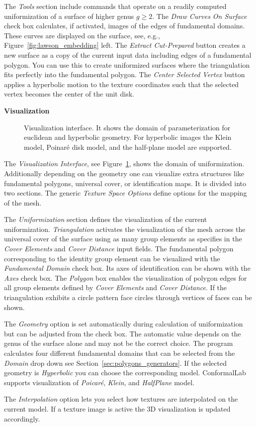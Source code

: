 \documentclass[Thesis.tex]{subfiles}
\begin{document}
The \emph{Tools} section include commands that operate on a readily computed uniformization of a surface of higher genus $g\geq 2$. 
The \emph{Draw Curves On Surface} check box calculates, if activated, images of the edges of fundamental domains. 
These curves are displayed on the surface, see, e.g., Figure~\ref{fig:lawson_embedding} left. 
The \emph{Extract Cut-Prepared} button creates a new surface as a copy of the current input data including edges of a fundamental polygon. 
You can use this to create uniformized surfaces where the triangulation fits perfectly into the fundamental polygon. 
The \emph{Center Selected Vertex} button applies a hyperbolic motion to the texture coordinates such that the selected vertex becomes the center of the unit disk.

{\bf Visualization}

\begin{figure}
\caption{Visualization interface. It shows the domain of parameterization for euclidean and hyperbolic geometry. 
For hyperbolic images the Klein model, Poinar\'e disk model, and the half-plane model are supported.}
\label{fig:visualization_interfaces}
\end{figure}

The \emph{Visualization Interface}, see Figure~\ref{fig:visualization_interfaces}, shows the domain of uniformization. 
Additionally depending on the geometry one can visualize extra structures like fundamental polygons, universal cover, or identification maps. 
It is divided into two sections. The generic \emph{Texture Space Options} define options for the mapping of the mesh. 

The \emph{Uniformization} section defines the visualization of the current uniformization. 
\emph{Triangulation} activates the visualization of the mesh across the universal cover of the surface using as many group elements as specifies in the \emph{Cover Elements} and \emph{Cover Distance} input fields. 
The fundamental polygon corresponding to the identity group element can be visualized with the \emph{Fundamental Domain} check box. Its axes of identification can be shown with the \emph{Axes} check box. 
The \emph{Polygon} box enables the visualization of polygon edges for all group elements defined by \emph{Cover Elements} and \emph{Cover Distance}. 
If the triangulation exhibits a circle pattern face circles through vertices of faces can be shown.

The \emph{Geometry} option is set automatically during calculation of uniformization but can be adjusted from the check box. The automatic value depends on the genus of the surface alone and may not be the correct choice. The program calculates four different fundamental domains that can be selected from the \emph{Domain} drop down see Section~\ref{sec:polygons_generators}. If the selected geometry is \emph{Hyperbolic} you can choose the corresponding model. {\sc ConformalLab} supports visualization of \emph{Poicar\'e}, \emph{Klein}, and \emph{HalfPlane} model.

The \emph{Interpolation} option lets you select how textures are interpolated on the current model. 
If a texture image is active the 3D visualization is updated accordingly.


\subfilebibliography
\end{document}

